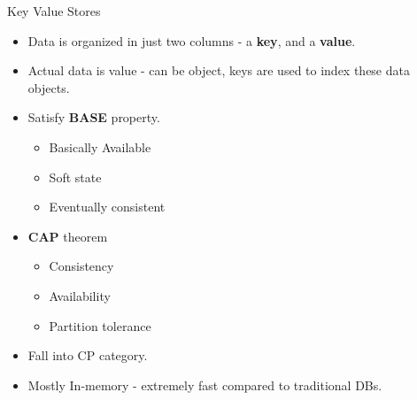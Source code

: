 \documentclass{beamer}
\begin{document}
\begin{frame}{Key Value Stores}
    \begin{itemize}
        \item Data is organized in just two columns - a \textbf{key}, and a \textbf{value}.
        
        \item Actual data is value - can be object, keys are used to index these data objects.
        
        \item Satisfy \textbf{BASE} property.
            
            \begin{itemize}
                \item Basically Available
                
                \item Soft state
                
                \item Eventually consistent
            \end{itemize}
        
        \item \textbf{CAP} theorem
            \begin{itemize}
                
                \item Consistency
                
                \item Availability
                
                \item Partition tolerance
            \end{itemize}
       
        \item Fall into CP category.
        
        \item Mostly In-memory - extremely fast compared to traditional DBs.
    \end{itemize}
\end{frame}
\end{document}

